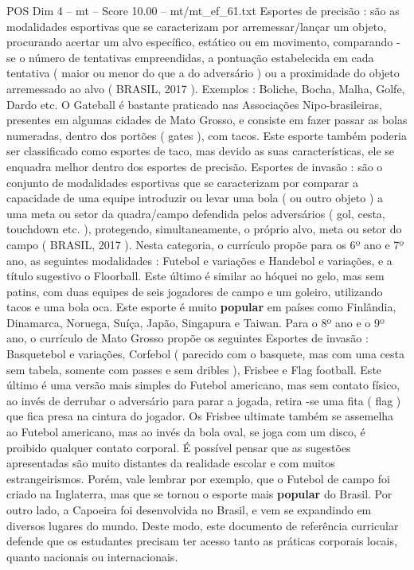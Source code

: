 \begin{textsample}{POS Dim 4 – mt – Score 10.00 – mt/mt\_ef\_61.txt}
Esportes de precisão : são as modalidades esportivas que se caracterizam por arremessar/lançar um objeto, procurando acertar um alvo específico, estático ou em movimento, comparando -se o número de tentativas empreendidas, a pontuação estabelecida em cada tentativa ( maior ou menor do que a do adversário ) ou a proximidade do objeto arremessado ao alvo ( BRASIL, 2017 ).
Exemplos : Boliche, Bocha, Malha, Golfe, Dardo etc.
O Gateball é bastante praticado nas Associações Nipo-brasileiras, presentes em algumas cidades de Mato Grosso, e consiste em fazer passar as bolas numeradas, dentro dos portões ( gates ), com tacos.
Este esporte também poderia ser classificado como esportes de taco, mas devido as suas características, ele se enquadra melhor dentro dos esportes de precisão.
Esportes de invasão : são o conjunto de modalidades esportivas que se caracterizam por comparar a capacidade de uma equipe introduzir ou levar uma bola ( ou outro objeto ) a uma meta ou setor da quadra/campo defendida pelos adversários ( gol, cesta, touchdown etc. ), protegendo, simultaneamente, o próprio alvo, meta ou setor do campo ( BRASIL, 2017 ).
Nesta categoria, o currículo propõe para os 6º ano e 7º ano, as seguintes modalidades : Futebol e variações e Handebol e variações, e a título sugestivo o Floorball.
Este último é similar ao hóquei no gelo, mas sem patins, com duas equipes de seis jogadores de campo e um goleiro, utilizando tacos e uma bola oca.
Este esporte é muito \textbf{popular} em países como Finlândia, Dinamarca, Noruega, Suíça, Japão, Singapura e Taiwan.
Para o 8º ano e o 9º ano, o currículo de Mato Grosso propõe os seguintes Esportes de invasão : Basquetebol e variações, Corfebol ( parecido com o basquete, mas com uma cesta sem tabela, somente com passes e sem dribles ), Frisbee e Flag football.
Este último é uma versão mais simples do Futebol americano, mas sem contato físico, ao invés de derrubar o adversário para parar a jogada, retira -se uma fita ( flag ) que fica presa na cintura do jogador.
Os Frisbee ultimate também se assemelha ao Futebol americano, mas ao invés da bola oval, se joga com um disco, é proibido qualquer contato corporal.
É possível pensar que as sugestões apresentadas são muito distantes da realidade escolar e com muitos estrangeirismos.
Porém, vale lembrar por exemplo, que o Futebol de campo foi criado na Inglaterra, mas que se tornou o esporte mais \textbf{popular} do Brasil.
Por outro lado, a Capoeira foi desenvolvida no Brasil, e vem se expandindo em diversos lugares do mundo.
Deste modo, este documento de referência curricular defende que os estudantes precisam ter acesso tanto as práticas corporais locais, quanto nacionais ou internacionais.

\end{textsample}
